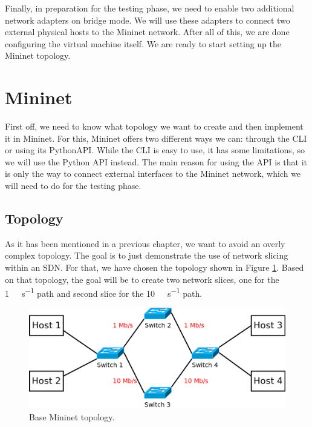 Finally, in preparation for the testing phase, we need to enable two additional network adapters on bridge mode. We will use these adapters to connect two external physical hosts to the Mininet network. After all of this, we are done configuring the virtual machine itself. We are ready to start setting up the Mininet topology.

\section{Mininet}
First off, we need to know what topology we want to create and then implement it in Mininet. For this, Mininet offers two different ways we can: through the CLI or using its Python\footnotemark API. While the CLI is easy to use, it has some limitations, so we will use the Python API instead. The main reason for using the API is that it is only the way to connect external interfaces to the Mininet network, which we will need to do for the testing phase. 


\subsection{Topology}
As it has been mentioned in a previous chapter, we want to avoid an overly complex topology. The goal is to just demonstrate the use of network slicing within an SDN. For that, we have chosen the topology shown in Figure \ref{fig:mininet_topology}\footnotemark. Based on that topology, the goal will be to create two network slices, one for the \SI[per-mode=symbol]{1}{\mega\bit\per\second} path and second slice for the \SI[per-mode=symbol]{10}{\mega\bit\per\second} path. 


\begin{figure}
  \centering
  \includegraphics[width=\linewidth]{imagenes/Environment/mininet_topology.png}
  \caption{Base Mininet topology.}
  \label{fig:mininet_topology}
\end{figure}

